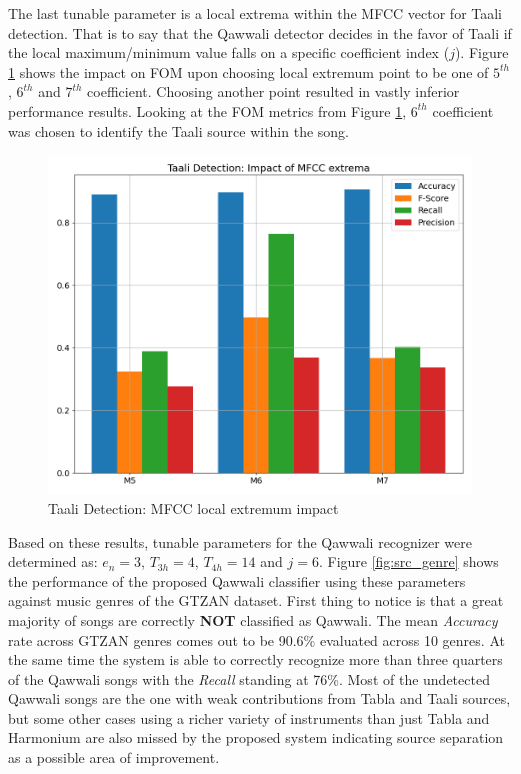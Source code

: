 \documentclass{article}
\begin{document}
The last tunable parameter is a local extrema within the MFCC vector for Taali detection. That is to say that the Qawwali detector decides in the favor of Taali if the local maximum/minimum value falls on a specific coefficient index ($j$). Figure \ref{fig:src_mfcc} shows the impact on FOM upon choosing local extremum point to be one of $5^{th}$, $6^{th}$ and $7^{th}$ coefficient. Choosing another point resulted in vastly inferior performance results. Looking at the FOM metrics from Figure \ref{fig:src_mfcc}, $6^{th}$ coefficient was chosen to identify the Taali source within the song.
\begin{figure}[htbp]
  \centering
  \includegraphics[scale=0.75, width=0.95\columnwidth]{taali_mfcc}
  \caption{Taali Detection: MFCC local extremum impact}
\label{fig:src_mfcc}
\end{figure}

Based on these results, tunable parameters for the Qawwali recognizer were determined as: $e_{n}=3$, $T_{3h}=4$, $T_{4h}=14$ and $j=6$. Figure \ref{fig:src_genre} shows the performance of the proposed Qawwali classifier using these parameters against music genres of the GTZAN dataset. First thing to notice is that a great majority of songs are correctly \textbf{NOT} classified as Qawwali. The mean \textit{Accuracy} rate across GTZAN genres comes out to be 90.6\% evaluated across 10 genres. At the same time the system is able to correctly recognize more than three quarters of the Qawwali songs with the \textit{Recall} standing at 76\%. Most of the undetected Qawwali songs are the one with weak contributions from Tabla and Taali sources, but some other cases using a richer variety of instruments than just Tabla and Harmonium are also missed by the proposed system indicating source separation as a possible area of improvement.
\end{document}
